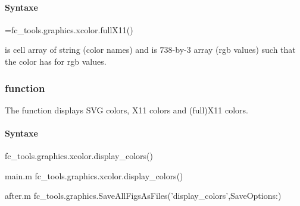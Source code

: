 \paragraph{Syntaxe}
\begin{syntaxe}
=fc_tools.graphics.xcolor.fullX11()
\end{syntaxe}

 is cell array of string (color names) and  is $738$-by-$3$ array (rgb values)
such that the color  has  for rgb values.

\subsubsection[fc\_tools.graphics.xcolor.display\_colors function]{ function}
The  function displays SVG colors, X11 colors and (full)X11 colors.

\paragraph{Syntaxe}
\begin{syntaxe}
fc_tools.graphics.xcolor.display_colors()
\end{syntaxe}

\begin{filecontents*}{main.m}
fc_tools.graphics.xcolor.display_colors()
\end{filecontents*}
\begin{filecontents*}{after.m}
fc_tools.graphics.SaveAllFigsAsFiles('display_colors',SaveOptions{:})
\end{filecontents*}

\begin{center}
\end{center}

